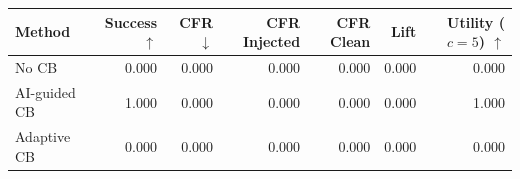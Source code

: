 \begin{tabular}{lrrrrrr}
\toprule
Method & Success $\uparrow$ & CFR $\downarrow$ & CFR Injected & CFR Clean & Lift & Utility ($c=5$) $\uparrow$ \\
\midrule
No CB & 0.000 & 0.000 & 0.000 & 0.000 & 0.000 & 0.000 \\
AI-guided CB & 1.000 & 0.000 & 0.000 & 0.000 & 0.000 & 1.000 \\
Adaptive CB & 0.000 & 0.000 & 0.000 & 0.000 & 0.000 & 0.000 \\
\bottomrule
\end{tabular}
